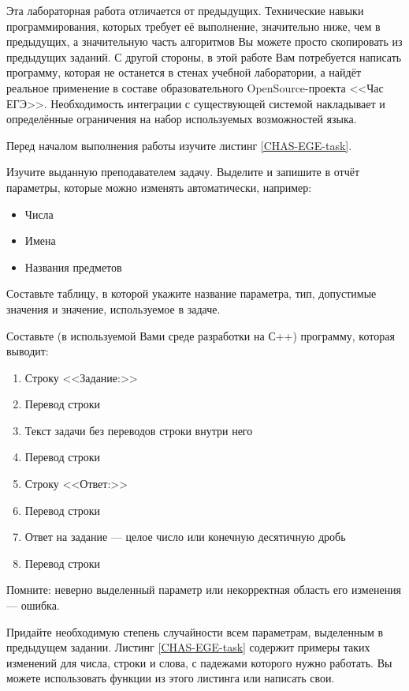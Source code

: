 
Эта лабораторная работа отличается от предыдущих.
Технические навыки программирования, которых требует её выполнение, значительно ниже, чем в предыдущих,
а значительную часть алгоритмов Вы можете просто скопировать из предыдущих заданий.
С другой стороны, в этой работе Вам потребуется написать программу, которая не останется в стенах учебной лаборатории, а найдёт реальное применение в составе образовательного OpenSource-проекта <<Час ЕГЭ>>.
Необходимость интеграции с существующей системой накладывает и определённые ограничения на набор используемых возможностей языка.

Перед началом выполнения работы изучите листинг \ref{CHAS-EGE-task}.

\labtask

Изучите выданную преподавателем задачу.
Выделите и запишите в отчёт параметры, которые можно изменять автоматически, например:
\begin{itemize}
	\item
		Числа
	\item
		Имена
	\item
		Названия предметов
\end{itemize}

Составьте таблицу, в которой укажите название параметра, тип, допустимые значения и значение, используемое в задаче.

\labtask

Составьте (в используемой Вами среде разработки на С++) программу, которая выводит:
\begin{enumerate}
	\item
		Строку <<Задание:>>
	\item
		Перевод строки
	\item
		Текст задачи без переводов строки внутри него
	\item
		Перевод строки
	\item
		Строку <<Ответ:>>
	\item
		Перевод строки
	\item
		Ответ на задание --- целое число или конечную десятичную дробь
	\item
		Перевод строки
\end{enumerate}

Помните: неверно выделенный параметр или некорректная область его изменения --- ошибка.

\labtask

Придайте необходимую степень случайности всем параметрам, выделенным в предыдущем задании.
Листинг \ref{CHAS-EGE-task} содержит примеры таких изменений для числа, строки и слова, с падежами которого нужно работать.
Вы можете использовать функции из этого листинга или написать свои.

